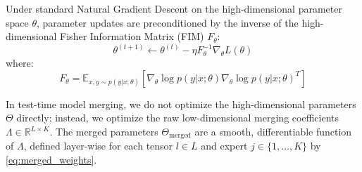 \documentclass{article}
\theoremstyle{plain}
\theoremstyle{definition}
\theoremstyle{remark}
\begin{document}
Under standard Natural Gradient Descent on the high-dimensional parameter space $\theta$, parameter updates are preconditioned by the inverse of the high-dimensional Fisher Information Matrix (FIM) $F_{\theta}$:
\begin{equation}
    \label{eq:ngd_high_dim}
    \theta^{(t+1)} \leftarrow \theta^{(t)} - \eta F_{\theta}^{-1} \nabla_{\theta} L(\theta)
\end{equation}
where:
\begin{equation}
    F_{\theta} = \mathbb{E}_{x, y \sim p(y|x; \theta)} \left[ \nabla_{\theta} \log p(y | x; \theta) \nabla_{\theta} \log p(y | x; \theta)^T \right]
\end{equation}

In test-time model merging, we do not optimize the high-dimensional parameters $\Theta$ directly; instead, we optimize the raw low-dimensional merging coefficients $\Lambda \in \mathbb{R}^{L \times K}$. The merged parameters $\Theta_{\text{merged}}$ are a smooth, differentiable function of $\Lambda$, defined layer-wise for each tensor $l \in L$ and expert $j \in \{1,\dots, K\}$ by \cref{eq:merged_weights}.
\end{document}
